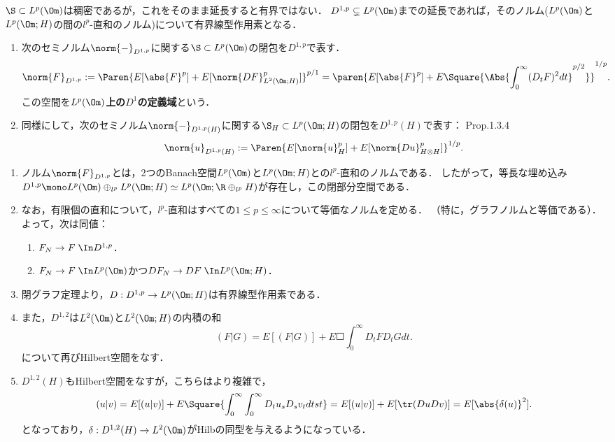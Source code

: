 \documentclass[uplatex,dvipdfmx]{jsreport}
\begin{document}
\begin{tcolorbox}[colframe=ForestGreen, colback=ForestGreen!10!white,breakable,colbacktitle=ForestGreen!40!white,coltitle=black,fonttitle=\bfseries\sffamily,
title=]
    $\S\subset L^p(\Om)$は稠密であるが，これをそのまま延長すると有界ではない．
    $D^{1,p}\subsetneq L^p(\Om)$までの延長であれば，そのノルム($L^p(\Om)$と$L^p(\Om;H)$の間の$l^p$-直和のノルム)について有界線型作用素となる．
\end{tcolorbox}

\begin{definition}\mbox{}
    \begin{enumerate}
        \item 次のセミノルム$\norm{-}_{D^{1,p}}$に関する$\S\subset L^p(\Om)$の閉包を$D^{1,p}$で表す．
        \[\norm{F}_{D^{1,p}}:=\Paren{E[\abs{F}^p]+E[\norm{DF}_{L^2(\Om;H)}^p]}^{p/1}=\paren{E[\abs{F}^p]+E\Square{\Abs{\int^\infty_0(D_tF)^2dt}^{p/2}}}^{1/p}.\]
        この空間を\textbf{$L^p(\Om)$上の$D^1$の定義域}という\cite{Nourdin-Peccati12-NormalApproximation}．
        \item 同様にして，次のセミノルム$\norm{-}_{D^{1,p}(H)}$に関する$\S_H\subset L^p(\Om;H)$の閉包を$D^{1,p}(H)$で表す：\cite{Kunze13-Malliavin} Prop.1.3.4
        \[\norm{u}_{D^{1,p}(H)}:=\Paren{E[\norm{u}_{H}^p]+E[\norm{Du}_{H\otimes H}^p]}^{1/p}.\]
    \end{enumerate}
\end{definition}
\begin{remarks}[ノルムの定め方について]\mbox{}
    \begin{enumerate}
        \item ノルム$\norm{F}_{D^{1,p}}$とは，2つのBanach空間$L^p(\Om)$と$L^p(\Om;H)$との$l^p$-直和のノルムである．
        したがって，等長な埋め込み$D^{1,p}\mono L^p(\Om)\oplus_{l^p} L^p(\Om;H)\simeq L^p(\Om;\R\oplus_{l^p} H)$が存在し，この閉部分空間である．
        \item なお，有限個の直和について，$l^p$-直和はすべての$1\le p\le \infty$について等価なノルムを定める．
        （特に，グラフノルムと等価である）．よって，次は同値：
        \begin{enumerate}
            \item $F_N\to F\;\In D^{1,p}$．
            \item $F_N\to F\;\In L^p(\Om)$かつ$DF_N\to DF\;\In L^p(\Om;H)$．
        \end{enumerate}
        \item 閉グラフ定理より，$D:D^{1,p}\to L^p(\Om;H)$は有界線型作用素である．
        \item また，$D^{1,2}$は$L^2(\Om)$と$L^2(\Om;H)$の内積の和
        \[(F|G)=E[(F|G)]+E\Square{\int^\infty_0D_tFD_tGdt}.\]
        について再びHilbert空間をなす．
        \item $D^{1,2}(H)$もHilbert空間をなすが，こちらはより複雑で，
        \[(u|v)=E[(u|v)]+E\Square{\int^\infty_0\int^\infty_0D_tu_sD_sv_tdtst}=E[(u|v)]+E[\tr(DuDv)]=E[\abs{\delta(u)}^2].\]
        となっており，$\delta:D^{1,2}(H)\to L^2(\Om)$がHilbの同型を与えるようになっている．
    \end{enumerate}
\end{remarks}
\end{document}
